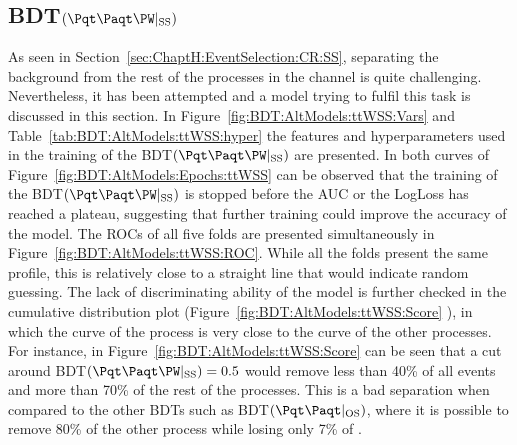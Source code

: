 
\subsection{BDT$(\ttW|_{\text{SS}})$}
\label{sec:BDT:AltModels:ttWSS}
As seen in Section~\ref{sec:ChaptH:EventSelection:CR:SS}, separating the \ttW background from the rest 
of the processes in the \dilepSStau channel is quite challenging. Nevertheless, it has been attempted and
a model trying to fulfil this task is discussed in this section. In Figure~\ref{fig:BDT:AltModels:ttWSS:Vars} and 
Table~\ref{tab:BDT:AltModels:ttWSS:hyper} the features and hyperparameters used in the training of the 
BDT$(\ttW|_{\text{SS}})$ are presented.  In both curves of Figure~\ref{fig:BDT:AltModels:Epochs:ttWSS}
can be observed that the training of the BDT$(\ttW|_{\text{SS}})$ is stopped before the AUC or the
LogLoss has reached a plateau, suggesting that further training could improve the accuracy of
the model. The ROCs of all five folds are presented simultaneously in Figure~\ref{fig:BDT:AltModels:ttWSS:ROC}.
While all the folds present the same profile, this is relatively close to a straight line that would indicate random
guessing. The lack of discriminating ability of the model is further checked in the cumulative distribution plot (Figure~\ref{fig:BDT:AltModels:ttWSS:Score} ), 
in which the curve of the \ttW process is very close to the curve of the other processes. For instance,
in Figure~\ref{fig:BDT:AltModels:ttWSS:Score} can be seen that a cut around BDT$(\ttW|_{\text{SS}})=0.5$
would remove less than 40\% of all \tWH events and more than 70\% of the rest of the processes. 
This is a bad separation when compared to the other BDTs such as BDT$(\ttbar|_{\text{OS}})$, where
it is possible to remove 80\% of the other process while losing only 7\% of \ttbar.



